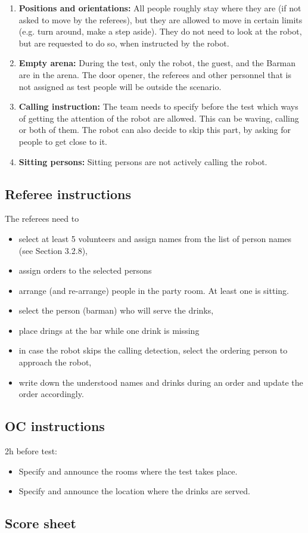 \begin{enumerate}
	\item \textbf{Positions and orientations:} All people roughly stay where they are (if not asked to move by the referees), but they are allowed to move in certain limits (e.g. turn around, make a step aside). They do not need to look at the robot, but are requested to do so, when instructed by the robot.

	\item \textbf{Empty arena:} During the test, only the robot, the guest, and the Barman are in the arena. The door opener, the referees and other personnel that is not assigned as test people will be outside the scenario.

	\item \textbf{Calling instruction:} The team needs to specify before the test which ways of getting the attention of the robot are allowed. This can be waving, calling or both of them. The robot can also decide to skip this part, by asking for people to get close to it.
	
	\item \textbf{Sitting persons:} Sitting persons are not actively calling the robot.
\end{enumerate}

\subsection{Referee instructions}

The referees need to
\begin{itemize}
	\item select at least 5 volunteers and assign names from the list of person names (see Section 3.2.8),
	\item assign orders to the selected persons
	\item arrange (and re-arrange) people in the party room. At least one is sitting.
	\item select the person (barman) who will serve the drinks,
	\item place drings at the bar while one drink is missing
	\item in case the robot skips the calling detection, select the ordering person to approach the robot,
	\item write down the understood names and drinks during an order and update the order accordingly.
\end{itemize}

\subsection{OC instructions}

2h before test:
\begin{itemize}
	\item Specify and announce the rooms where the test takes place.
	\item Specify and announce the location where the drinks are served.
\end{itemize}

\newpage
\subsection{Score sheet}

